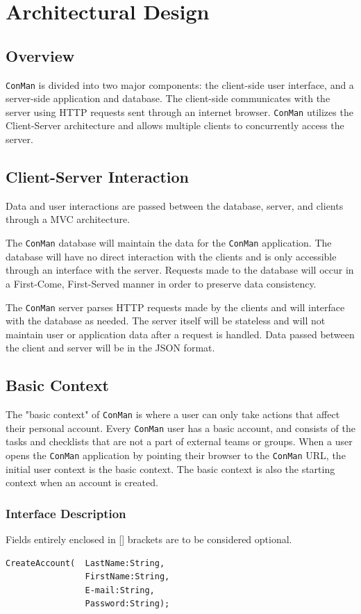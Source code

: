 \documentclass{article}
\begin{document}
\section{Architectural Design}
\subsection{Overview}
\texttt{ConMan} is divided into two major components: the client-side user interface, and a server-side application and database.
The client-side communicates with the server using HTTP requests sent through an internet browser.  
\texttt{ConMan} utilizes the Client-Server architecture and allows multiple clients to concurrently access the server.  

\subsection{Client-Server Interaction}
Data and user interactions are passed between the database, server, and clients through a MVC architecture.

The \texttt{ConMan} database will maintain the data for the \texttt{ConMan} application.  
The database will have no direct interaction with the clients and is only accessible through an interface with the server.
Requests made to the database will occur in a First-Come, First-Served manner in order to preserve data consistency.

The \texttt{ConMan} server parses HTTP requests made by the clients and will interface with the database as needed.  
The server itself will be stateless and will not maintain user or application data after a request is handled.
Data passed between the client and server will be in the JSON format.

\subsection{Basic Context}
The "basic context" of \texttt{ConMan} is where a user can only take actions that affect their personal account.
Every \texttt{ConMan} user has a basic account, and consists of the tasks and checklists that are not a part of external teams or groups.
When a user opens the \texttt{ConMan} application by pointing their browser to the \texttt{ConMan} URL, the initial user context is the basic context.
The basic context is also the starting context when an account is created.


\subsubsection{Interface Description}
Fields entirely enclosed in [] brackets are to be considered optional.
\begin{lstlisting}
CreateAccount(  LastName:String,
                FirstName:String,
                E-mail:String,
                Password:String);
\end{lstlisting}
\end{document}
